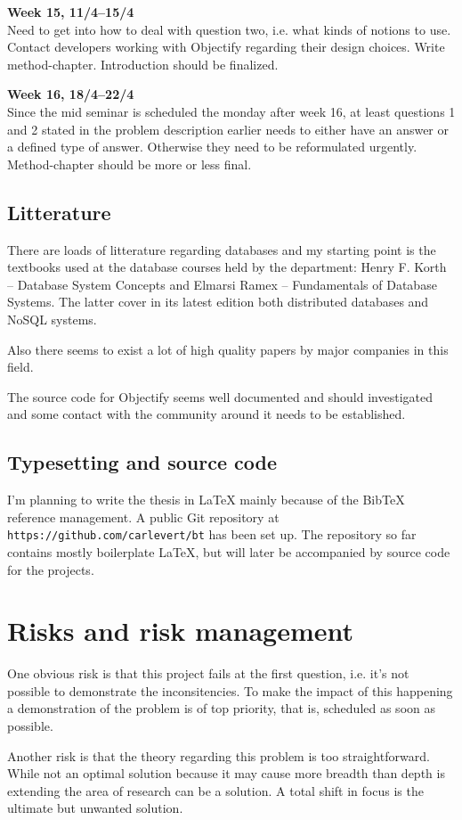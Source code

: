 \documentclass[10pt, titlepage, oneside, a4paper]{article}
\begin{document}
\textbf{Week 15, 11/4--15/4}\\
Need to get into how to deal with question two, i.e. what kinds of
notions to use. Contact developers working with Objectify regarding
their design choices. Write method-chapter. Introduction should be finalized.


\textbf{Week 16, 18/4--22/4}\\
Since the mid seminar is scheduled the monday after week 16, at least 
questions 1 and 2 stated in the problem description earlier needs to either
have an answer or a defined type of answer. Otherwise they
need to be reformulated urgently. Method-chapter should be more or
less final.




\subsection*{Litterature}

There are loads of litterature regarding databases and my starting
point is the textbooks used at the database courses held by the
department: Henry F. Korth -- Database System Concepts and Elmarsi
Ramex -- Fundamentals of Database Systems. The latter cover in its
latest edition both distributed databases and NoSQL systems.

Also there seems to exist a lot of high quality papers by
major companies in this field.

The source code for Objectify seems well documented and should
investigated and some contact with the community around it needs to be established.

\subsection*{Typesetting and source code}

I'm planning to write the thesis in LaTeX mainly because of the BibTeX
reference management. A public Git repository at
\texttt{https://github.com/carlevert/bt} has been set up. The
repository so far contains mostly boilerplate LaTeX, but will later be
accompanied by source code for the projects.

\section*{Risks and risk management}

One obvious risk is that this project fails at the first question,
i.e. it's not possible to demonstrate the inconsitencies. To make the
impact of this happening a demonstration of the problem is of top
priority, that is, scheduled as soon as possible.

Another risk is that the theory regarding this problem is too
straightforward. While not an optimal solution because it may cause
more breadth than depth is extending the area of
research can be a solution. A total shift in focus is the ultimate but
unwanted solution.
\end{document}
